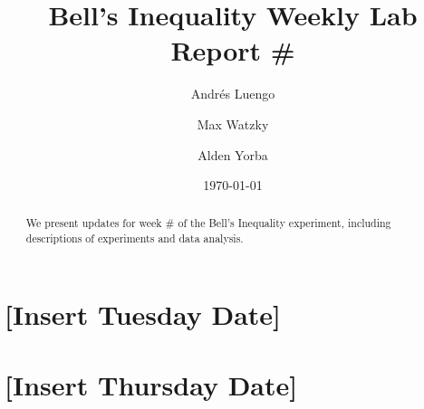 \documentclass[letter,scriptaddress,twocolumn, prl,showkeys]{revtex4}
\begin{document}
\title{Bell's Inequality Weekly Lab Report \#}

\author{Andr\'{e}s Luengo}
\author{Max Watzky}
\author{Alden Yorba} 


\date{\today}

\begin{abstract}
  We present updates for week \# of the Bell's Inequality experiment, including descriptions of experiments and data analysis.
\end{abstract}


\maketitle

\section{[Insert Tuesday Date]}


\section{[Insert Thursday Date]}



\begin{acknowledgements}

\end{acknowledgements}

\begin{thebibliography}{}

\bibitem{}

\end{thebibliography}
\end{document}

